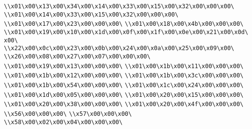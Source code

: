 \verb|\\x01\x00\x13\x00\x34\x00\x14\x00\x33\x00\x15\x00\x32\x00\x00\x00\|\newline
\verb|\\x01\x00\x14\x00\x33\x00\x15\x00\x32\x00\x00\x00\|\newline
\verb|\\x01\x00\x17\x00\x23\x00\x00\x00\|\newline
\verb|\\x01\x00\x18\x00\x4b\x00\x00\x00\|\newline
\verb|\\x01\x00\x19\x00\x10\x00\x1d\x00\x0f\x00\x1f\x00\x0e\x00\x21\x00\x0d\x00\|\newline
\verb|\\x22\x00\x0c\x00\x23\x00\x0b\x00\x24\x00\x0a\x00\x25\x00\x09\x00\|\newline
\verb|\\x26\x00\x08\x00\x27\x00\x07\x00\x00\x00\|\newline
\verb|\\x01\x00\x19\x00\x13\x00\x00\x00\|\newline
\verb|\\x01\x00\x1b\x00\x11\x00\x00\x00\|\newline
\verb|\\x01\x00\x1b\x00\x12\x00\x00\x00\|\newline
\verb|\\x01\x00\x1b\x00\x3c\x00\x00\x00\|\newline
\verb|\\x01\x00\x1b\x00\x54\x00\x00\x00\|\newline
\verb|\\x01\x00\x1c\x00\x24\x00\x00\x00\|\newline
\verb|\\x01\x00\x1d\x00\x05\x00\x00\x00\|\newline
\verb|\\x01\x00\x20\x00\x15\x00\x00\x00\|\newline
\verb|\\x01\x00\x20\x00\x38\x00\x00\x00\|\newline
\verb|\\x01\x00\x20\x00\x4f\x00\x00\x00\|\newline
\verb|\\x56\x00\x00\x00\|\newline
\verb|\\x57\x00\x00\x00\|\newline
\verb|\\x58\x00\x02\x00\x04\x00\x00\x00\|\newline
